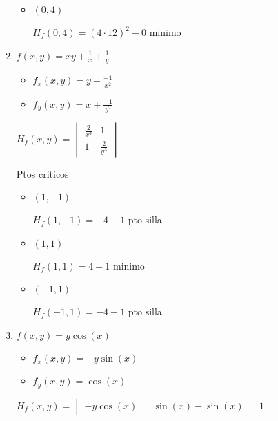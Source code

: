 \documentclass[../practica_06.tex]{subfiles}
\begin{document}
\begin{enumerate}
\begin{itemize}
                \item $(0,4)$
                

                    $H_f(0,4) = (4\cdot 12)^2 - 0 $ minimo

            \end{itemize}

        \item $f(x,y) = xy + \frac{1}{x} + \frac{1}{y}$
        
            \begin{itemize}
                \item $f_x(x,y) = y + \frac{-1}{x^2}$
                \item $f_y(x,y) = x + \frac{-1}{y^2}$
            \end{itemize}

            $H_f(x,y) = \begin{vmatrix}
                \frac{2}{x^3} & 1 \\
                1 & \frac{2}{y^3}
            \end{vmatrix}$

            Ptos criticos\begin{itemize}
                \item $(1,-1)$
                
                    $H_f(1,-1) = -4 - 1$ pto silla

                \item $(1,1)$
                
                    $H_f(1,1) = 4 - 1$ minimo
                    
                \item $(-1,1)$
                
                    $H_f(-1,1) = -4 - 1$ pto silla
                \end{itemize}
 
        \item $f(x,y) = y\cos(x)$
        
            \begin{itemize}
                \item $f_x(x,y) = -y\sin(x)$
                \item $f_y(x,y) = \cos(x)$
            \end{itemize}

            $H_f(x,y) = \begin{vmatrix}
                -y\cos(x) && \sin(x)
                -\sin(x) && 1
            \end{vmatrix}$


\end{enumerate}
\end{document}

